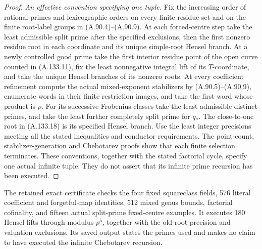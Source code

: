 \begin{proof}
\emph{An effective convention specifying one tuple.}
Fix the increasing order of rational primes and
lexicographic orders on every finite residue set
and on the finite root-label groups in
(A.90.4)--(A.90.9).
At each forced-centre step take the least admissible
split prime after the specified exclusions, then
the first nonzero residue root in each coordinate
and its unique simple-root Hensel branch.
At a newly controlled good prime take the first
interior residue point of the open curve counted
in (A.133.11), fix the least nonnegative integral
lift of its \(T\)-coordinate, and take the unique
Hensel branches of its nonzero roots.
At every coefficient refinement compute the
actual mixed-exponent stabilizers by
(A.90.5)--(A.90.9), enumerate words in their
finite restriction images, and take the first
word whose product is \(\rho\).
For its successive Frobenius classes take the
least admissible distinct primes, and take the
least further completely split prime for \(q_*\).
The close-to-one root in (A.133.18) is its specified
Hensel branch.
Use the least integer precisions meeting all the
stated inequalities and conductor requirements.
The point-count, stabilizer-generation and
Chebotarev proofs show that each finite selection
terminates.  These conventions, together with
the stated factorial cycle, specify one actual
infinite tuple.  They do not assert that its
infinite prime recursion has been executed.
\end{proof}

The retained exact certificate
checks the four fixed squareclass fields, 576 literal
coefficient and forgetful-map identities, 512 mixed
genus bounds, factorial cofinality, and fifteen actual
split-prime fixed-centre examples.  It executes 180
Hensel lifts through modulus \(p^5\), together with
the old-root precision and valuation exclusions.
Its saved output states the primes used and makes
no claim to have executed the infinite Chebotarev
recursion.

